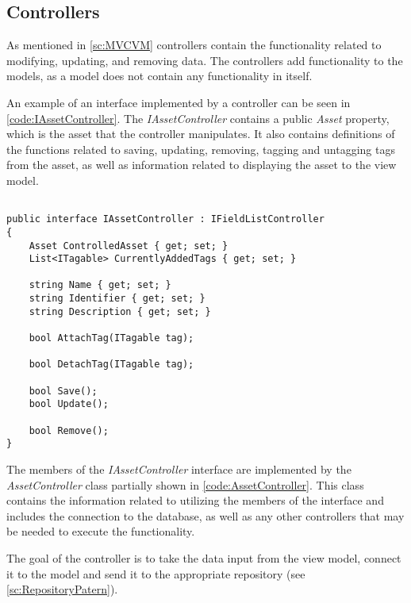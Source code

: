 \subsection{Controllers} \label{sc:Controllers}
As mentioned in \autoref{sc:MVCVM} controllers contain the functionality related to modifying, updating, and removing data. The controllers add functionality to the models, as a model does not contain any functionality in itself. 
\par
An example of an interface implemented by a controller can be seen in \autoref{code:IAssetController}. The \textit{IAssetController} contains a public \textit{Asset} property, which is the asset that the controller manipulates. It also contains definitions of the functions related to saving, updating, removing, tagging and untagging tags from the asset, as well as information related to displaying the asset to the view model.

\begin{listing}[H]
\begin{verbatim}

public interface IAssetController : IFieldListController
{
    Asset ControlledAsset { get; set; }
    List<ITagable> CurrentlyAddedTags { get; set; }

    string Name { get; set; }
    string Identifier { get; set; }
    string Description { get; set; }

    bool AttachTag(ITagable tag);

    bool DetachTag(ITagable tag);

    bool Save();
    bool Update();

    bool Remove();
}

\end{verbatim}
\label{code:IAssetController}
\end{listing}

The members of the \textit{IAssetController} interface are implemented by the \textit{AssetController} class partially shown in \autoref{code:AssetController}. This class contains the information related to utilizing the members of the interface and includes the connection to the database, as well as any other controllers that may be needed to execute the functionality. 
\par
The goal of the controller is to take the data input from the view model, connect it to the model and send it to the appropriate repository (see \autoref{sc:RepositoryPatern}).


